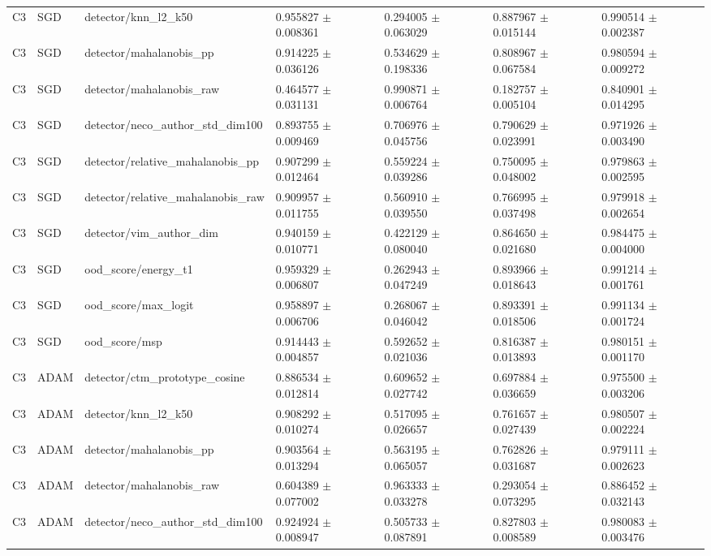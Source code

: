 \begin{longtable}{lllllll}
C3 & SGD & detector/knn\_l2\_k50 & 0.955827 $\pm$ 0.008361 & 0.294005 $\pm$ 0.063029 & 0.887967 $\pm$ 0.015144 & 0.990514 $\pm$ 0.002387 \\
C3 & SGD & detector/mahalanobis\_pp & 0.914225 $\pm$ 0.036126 & 0.534629 $\pm$ 0.198336 & 0.808967 $\pm$ 0.067584 & 0.980594 $\pm$ 0.009272 \\
C3 & SGD & detector/mahalanobis\_raw & 0.464577 $\pm$ 0.031131 & 0.990871 $\pm$ 0.006764 & 0.182757 $\pm$ 0.005104 & 0.840901 $\pm$ 0.014295 \\
C3 & SGD & detector/neco\_author\_std\_dim100 & 0.893755 $\pm$ 0.009469 & 0.706976 $\pm$ 0.045756 & 0.790629 $\pm$ 0.023991 & 0.971926 $\pm$ 0.003490 \\
C3 & SGD & detector/relative\_mahalanobis\_pp & 0.907299 $\pm$ 0.012464 & 0.559224 $\pm$ 0.039286 & 0.750095 $\pm$ 0.048002 & 0.979863 $\pm$ 0.002595 \\
C3 & SGD & detector/relative\_mahalanobis\_raw & 0.909957 $\pm$ 0.011755 & 0.560910 $\pm$ 0.039550 & 0.766995 $\pm$ 0.037498 & 0.979918 $\pm$ 0.002654 \\
C3 & SGD & detector/vim\_author\_dim & 0.940159 $\pm$ 0.010771 & 0.422129 $\pm$ 0.080040 & 0.864650 $\pm$ 0.021680 & 0.984475 $\pm$ 0.004000 \\
C3 & SGD & ood\_score/energy\_t1 & 0.959329 $\pm$ 0.006807 & 0.262943 $\pm$ 0.047249 & 0.893966 $\pm$ 0.018643 & 0.991214 $\pm$ 0.001761 \\
C3 & SGD & ood\_score/max\_logit & 0.958897 $\pm$ 0.006706 & 0.268067 $\pm$ 0.046042 & 0.893391 $\pm$ 0.018506 & 0.991134 $\pm$ 0.001724 \\
C3 & SGD & ood\_score/msp & 0.914443 $\pm$ 0.004857 & 0.592652 $\pm$ 0.021036 & 0.816387 $\pm$ 0.013893 & 0.980151 $\pm$ 0.001170 \\
C3 & ADAM & detector/ctm\_prototype\_cosine & 0.886534 $\pm$ 0.012814 & 0.609652 $\pm$ 0.027742 & 0.697884 $\pm$ 0.036659 & 0.975500 $\pm$ 0.003206 \\
C3 & ADAM & detector/knn\_l2\_k50 & 0.908292 $\pm$ 0.010274 & 0.517095 $\pm$ 0.026657 & 0.761657 $\pm$ 0.027439 & 0.980507 $\pm$ 0.002224 \\
C3 & ADAM & detector/mahalanobis\_pp & 0.903564 $\pm$ 0.013294 & 0.563195 $\pm$ 0.065057 & 0.762826 $\pm$ 0.031687 & 0.979111 $\pm$ 0.002623 \\
C3 & ADAM & detector/mahalanobis\_raw & 0.604389 $\pm$ 0.077002 & 0.963333 $\pm$ 0.033278 & 0.293054 $\pm$ 0.073295 & 0.886452 $\pm$ 0.032143 \\
C3 & ADAM & detector/neco\_author\_std\_dim100 & 0.924924 $\pm$ 0.008947 & 0.505733 $\pm$ 0.087891 & 0.827803 $\pm$ 0.008589 & 0.980083 $\pm$ 0.003476 \\

\end{longtable}
